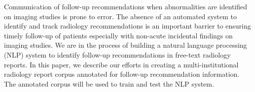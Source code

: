 Communication of follow-up recommendations when abnormalities are identified on imaging studies is prone to error. The absence of an automated system to identify and track radiology recommendations is an important barrier to ensuring timely follow-up of patients especially with non-acute incidental findings on imaging studies. We are in the process of building a natural language processing (NLP) system to identify follow-up recommendations in free-text radiology reports. In this paper, we describe our efforts in creating a multi-institutional radiology report corpus annotated for follow-up recommendation information. The annotated corpus will be used to train and test the NLP system.
